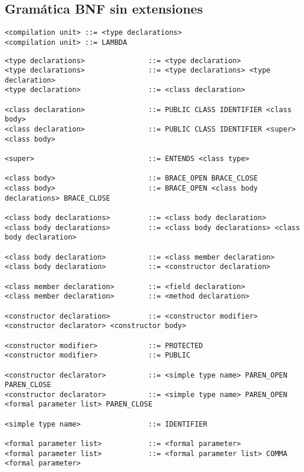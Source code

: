 \subsection{Gramática BNF sin extensiones}

\begin{lstlisting}
<compilation unit> ::= <type declarations>
<compilation unit> ::= LAMBDA
\end{lstlisting}

\begin{lstlisting}
<type declarations>               ::= <type declaration>
<type declarations>               ::= <type declarations> <type declaration>
<type declaration>                ::= <class declaration>

<class declaration>               ::= PUBLIC CLASS IDENTIFIER <class body>
<class declaration>               ::= PUBLIC CLASS IDENTIFIER <super> <class body>

<super>                           ::= ENTENDS <class type>

<class body>                      ::= BRACE_OPEN BRACE_CLOSE
<class body>                      ::= BRACE_OPEN <class body declarations> BRACE_CLOSE

<class body declarations>         ::= <class body declaration>
<class body declarations>         ::= <class body declarations> <class body declaration>

<class body declaration>          ::= <class member declaration>
<class body declaration>          ::= <constructor declaration>

<class member declaration>        ::= <field declaration>
<class member declaration>        ::= <method declaration>

<constructor declaration>         ::= <constructor modifier> <constructor declarator> <constructor body>

<constructor modifier>            ::= PROTECTED
<constructor modifier>            ::= PUBLIC

<constructor declarator>          ::= <simple type name> PAREN_OPEN PAREN_CLOSE
<constructor declarator>          ::= <simple type name> PAREN_OPEN <formal parameter list> PAREN_CLOSE

<simple type name>                ::= IDENTIFIER

<formal parameter list>           ::= <formal parameter>
<formal parameter list>           ::= <formal parameter list> COMMA <formal parameter>


\end{lstlisting}
